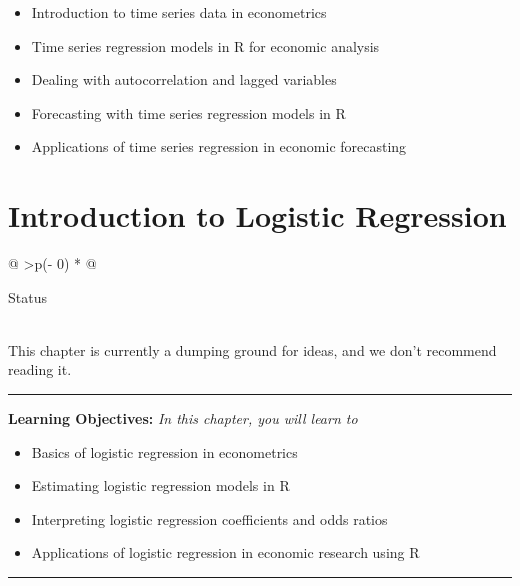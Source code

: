 \documentclass[
  letterpaper,
  paper =a4,
  twoside,
  openright,
  headsepline,
  footsepline,
  listof = totocnumbered,
  chapterprefix = true,
  firstiscover,
  parskip = full*]{scrbook}
\providecommand{\abstractname}{Learning Objectives} %
\newenvironment{objectives}[1]{%
	\hrule
	\vspace{5pt}
	\small\textbf{\abstractname: } 
	\newline
	\vspace{0.1cm}
	\small\emph{#1} %
	\itshape %
}{%
	\vspace{5pt}
	\hrule
	\vspace{0.6cm}
}
\begin{document}
\begin{itemize}
\item
  Introduction to time series data in econometrics
\item
  Time series regression models in R for economic analysis
\item
  Dealing with autocorrelation and lagged variables
\item
  Forecasting with time series regression models in R
\item
  Applications of time series regression in economic forecasting
\end{itemize}


\chapter{Introduction to Logistic
Regression}\label{introduction-to-logistic-regression}

\begin{longtable}[]{@{}
  >{\centering\arraybackslash}p{(\columnwidth - 0\tabcolsep) * }@{}}
\toprule\noalign{}
\begin{minipage}[b]{\linewidth}\centering
Status
\end{minipage} \\
\midrule\noalign{}
\endhead
\bottomrule\noalign{}
\endlastfoot
This chapter is currently a dumping ground for ideas, and we don't
recommend reading it. \\
\end{longtable}

\begin{objectives}{In this chapter, you will learn to}
\begin{itemize}

\item{Basics of logistic regression in econometrics}

\item{Estimating logistic regression models in R}

\item{Interpreting logistic regression coefficients and odds ratios}

\item{Applications of logistic regression in economic research using R}

\end{itemize}

\end{objectives}
\end{document}
